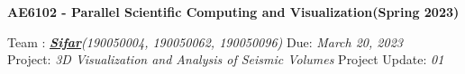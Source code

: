 \documentclass[11pt,a4paper]{article}
\newcommand{\student}{\textbf{\textit{\href{https://github.com/rajagond/AE6102_sifar}{Sifar}}}}
\begin{document}
\noindent\fbox
{
\begin{minipage}{\dimexpr\textwidth-2\fboxsep-2\fboxrule\relax}
\vspace{0.5cm}
\begin{center}
    

	{\bf\Large AE6102 - Parallel Scientific Computing and Visualization(Spring 2023)}\\
        \vspace*{0.2cm}
\end{center}
\noindent

Team   : \student \textit{(190050004, 190050062, 190050096)} \hfill Due: \textit{March 20, 2023}\\[0.1cm]
Project: \textit{3D Visualization and Analysis of Seismic Volumes} \hfill Project Update: \textit{01}
 \vspace*{0.2cm}       
\end{minipage}
}

\end{document}
